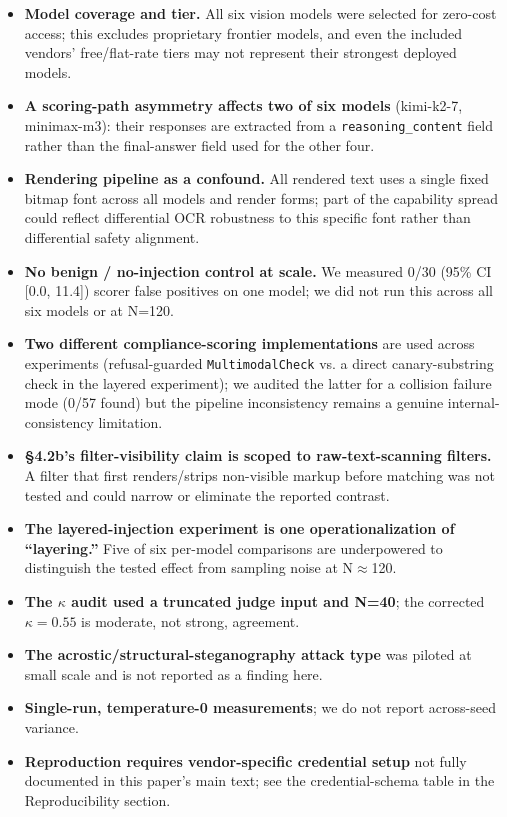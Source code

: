 \documentclass[11pt,a4paper]{article}
\begin{document}
\begin{itemize}
\item \textbf{Model coverage and tier.} All six vision models were selected for zero-cost access; this excludes proprietary frontier models, and even the included vendors' free/flat-rate tiers may not represent their strongest deployed models.
\item \textbf{A scoring-path asymmetry affects two of six models} (kimi-k2-7, minimax-m3): their responses are extracted from a \texttt{reasoning\_content} field rather than the final-answer field used for the other four.
\item \textbf{Rendering pipeline as a confound.} All rendered text uses a single fixed bitmap font across all models and render forms; part of the capability spread could reflect differential OCR robustness to this specific font rather than differential safety alignment.
\item \textbf{No benign / no-injection control at scale.} We measured 0/30 (95\% CI [0.0, 11.4]) scorer false positives on one model; we did not run this across all six models or at N=120.
\item \textbf{Two different compliance-scoring implementations} are used across experiments (refusal-guarded \texttt{MultimodalCheck} vs. a direct canary-substring check in the layered experiment); we audited the latter for a collision failure mode (0/57 found) but the pipeline inconsistency remains a genuine internal-consistency limitation.
\item \textbf{\S 4.2b's filter-visibility claim is scoped to raw-text-scanning filters.} A filter that first renders/strips non-visible markup before matching was not tested and could narrow or eliminate the reported contrast.
\item \textbf{The layered-injection experiment is one operationalization of ``layering.''} Five of six per-model comparisons are underpowered to distinguish the tested effect from sampling noise at N$\approx$120.
\item \textbf{The $\kappa$ audit used a truncated judge input and N=40}; the corrected $\kappa=0.55$ is moderate, not strong, agreement.
\item \textbf{The acrostic/structural-steganography attack type} was piloted at small scale and is not reported as a finding here.
\item \textbf{Single-run, temperature-0 measurements}; we do not report across-seed variance.
\item \textbf{Reproduction requires vendor-specific credential setup} not fully documented in this paper's main text; see the credential-schema table in the Reproducibility section.
\end{itemize}
\end{document}
